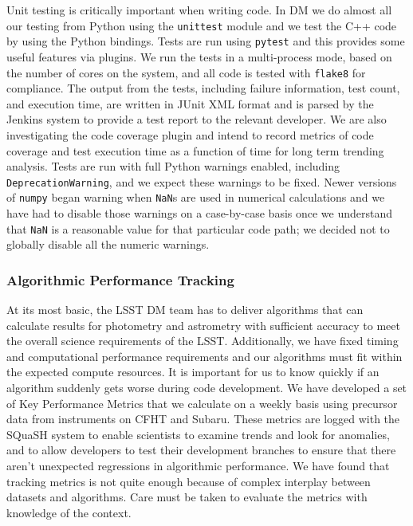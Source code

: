 Unit testing is critically important when writing code.
In DM we do almost all our testing from Python using the \texttt{unittest} module and we test the C++ code by using the Python bindings.
Tests are run using \texttt{pytest}\cite{pytest} and this provides some useful features via plugins.
We run the tests in a multi-process mode, based on the number of cores on the system, and all code is tested with \texttt{flake8} for compliance.
The output from the tests, including failure information, test count, and execution time, are written in JUnit XML format and is parsed by the Jenkins system to provide a test report to the relevant developer.
We are also investigating the code coverage plugin and intend to record metrics of code coverage and test execution time as a function of time for long term trending analysis.
Tests are run with full Python warnings enabled, including \texttt{DeprecationWarning}, and we expect these warnings to be fixed.
Newer versions of \texttt{numpy} began warning when \texttt{NaN}s are used in numerical calculations and we have had to disable those warnings on a case-by-case basis once we understand that \texttt{NaN} is a reasonable value for that particular code path; we decided not to globally disable all the numeric warnings.

\subsubsection{Algorithmic Performance Tracking}

At its most basic, the LSST DM team has to deliver algorithms that can calculate results for photometry and astrometry with sufficient accuracy to meet the overall science requirements of the LSST\cite{LPM-17}.
Additionally, we have fixed timing and computational performance requirements and our algorithms must fit within the expected compute resources.
It is important for us to know quickly if an algorithm suddenly gets worse during code development.
We have developed a set of Key Performance Metrics that we calculate on a weekly basis using precursor data from instruments on CFHT and Subaru.
These metrics are logged with the SQuaSH system\cite{SQR-009} to enable scientists to examine trends and look for anomalies, and to allow developers to test their development branches to ensure that there aren't unexpected regressions in algorithmic performance.
We have found that tracking metrics is not quite enough because of complex interplay between datasets and algorithms.
Care must be taken to evaluate the metrics with knowledge of the context.
